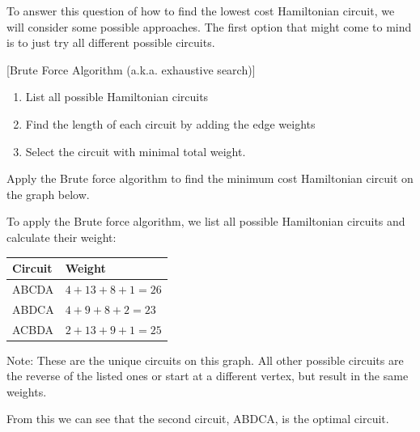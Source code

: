 To answer this question of how to find the lowest cost Hamiltonian circuit, we will consider some possible approaches.  The first option that might come to mind is to just try all different possible circuits.

\begin{algorithm}{}{}[Brute Force Algorithm (a.k.a. exhaustive search)]
\hspace{3in}
\begin{enumerate}
\item	List all possible Hamiltonian circuits
\item	Find the length of each circuit by adding the edge weights
\item	Select the circuit with minimal total weight.
\end{enumerate}
\end{algorithm}

\begin{example}{}{} %
Apply the Brute force algorithm to find the minimum cost Hamiltonian circuit on the graph below.\\

\begin{center}
\end{center}

To apply the Brute force algorithm, we list all possible Hamiltonian circuits and calculate their weight:
\begin{center}
\begin{tabular}{|l|l|}
\hline
Circuit & Weight\\
\hline 
ABCDA & $4+13+8+1=26$\\
\hline
ABDCA & $4+9+8+2=23$\\
\hline
ACBDA & $2+13+9+1=25$\\
\hline
\end{tabular}
\end{center}

Note:  These are the unique circuits on this graph.  All other possible circuits are the reverse of the listed ones or start at a different vertex, but result in the same weights.

From this we can see that the second circuit, ABDCA, is the optimal circuit.  
\end{example}

